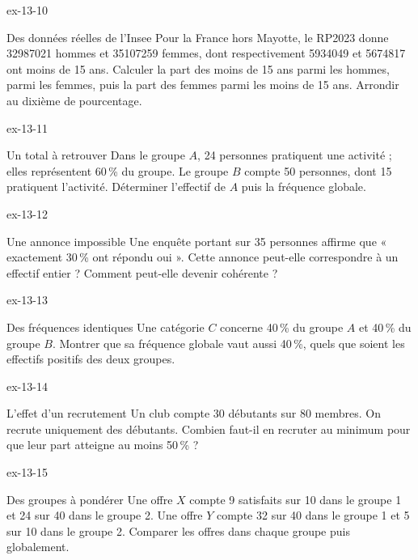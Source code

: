 \begin{blocLivre}{ex-13-10}
\begin{exercice}[2]{Des données réelles de l’Insee}
Pour la France hors Mayotte, le RP2023 donne 32987021 hommes et 35107259 femmes, dont respectivement 5934049 et 5674817 ont moins de 15 ans. Calculer la part des moins de 15 ans parmi les hommes, parmi les femmes, puis la part des femmes parmi les moins de 15 ans. Arrondir au dixième de pourcentage.\par\smallskip{}
\end{exercice}
\end{blocLivre}

\clearpage{}
\begin{blocLivre}{ex-13-11}
\begin{exercice}[3]{Un total à retrouver}
Dans le groupe $A$, 24 personnes pratiquent une activité ; elles représentent 60\,\% du groupe. Le groupe $B$ compte 50 personnes, dont 15 pratiquent l’activité. Déterminer l’effectif de $A$ puis la fréquence globale.
\end{exercice}
\end{blocLivre}
\begin{blocLivre}{ex-13-12}
\begin{exercice}[3]{Une annonce impossible}
Une enquête portant sur 35 personnes affirme que « exactement 30\,\% ont répondu oui ». Cette annonce peut-elle correspondre à un effectif entier ? Comment peut-elle devenir cohérente ?
\end{exercice}
\end{blocLivre}
\begin{blocLivre}{ex-13-13}
\begin{exercice}[3]{Des fréquences identiques}
Une catégorie $C$ concerne 40\,\% du groupe $A$ et 40\,\% du groupe $B$. Montrer que sa fréquence globale vaut aussi 40\,\%, quels que soient les effectifs positifs des deux groupes.
\end{exercice}
\end{blocLivre}
\begin{blocLivre}{ex-13-14}
\begin{exercice}[3]{L’effet d’un recrutement}
Un club compte 30 débutants sur 80 membres. On recrute uniquement des débutants. Combien faut-il en recruter au minimum pour que leur part atteigne au moins 50\,\% ?
\end{exercice}
\end{blocLivre}
\begin{blocLivre}{ex-13-15}
\begin{exercice}[3]{Des groupes à pondérer}
Une offre $X$ compte 9 satisfaits sur 10 dans le groupe 1 et 24 sur 40 dans le groupe 2. Une offre $Y$ compte 32 sur 40 dans le groupe 1 et 5 sur 10 dans le groupe 2. Comparer les offres dans chaque groupe puis globalement.
\end{exercice}
\end{blocLivre}

\clearpage
